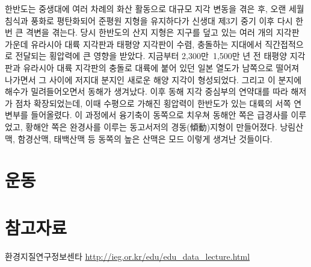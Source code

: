 \documentclass[12pt,a4paper]{book}
\newcommand{\SectionMargin}			{\newpage  \null \vskip 0cm}
\begin{document}
한반도는 중생대에 여러 차례의 화산 활동으로 대규모 지각 변동을 겪은 후, 오랜 세월 침식과 풍화로 평탄화되어 준평원 지형을 유지하다가 신생대 제3기 중기 이후 다시 한 번 큰 격변을 겪는다. 당시 한반도의 산지 지형은 지구를 덮고 있는 여러 개의 지각판 가운데 유라시아 대륙 지각판과 태평양 지각판이 수렴, 충돌하는 지대에서 직간접적으로 전달되는 횡압력에 큰 영향을 받았다. 지금부터 2,300만~1,500만 년 전 태평양 지각판과 유라시아 대륙 지각판의 충돌로 대륙에 붙어 있던 일본 열도가 남쪽으로 떨어져 나가면서 그 사이에 저지대 분지인 새로운 해양 지각이 형성되었다. 그리고 이 분지에 해수가 밀려들어오면서 동해가 생겨났다. 이후 동해 지각 중심부의 연약대를 따라 해저가 점차 확장되었는데, 이때 수평으로 가해진 횡압력이 한반도가 있는 대륙의 서쪽 연변부를 들어올렸다. 이 과정에서 융기축이 동쪽으로 치우쳐 동해안 쪽은 급경사를 이루었고, 황해안 쪽은 완경사를 이루는 동고서저의 경동(傾動)지형이 만들어졌다. 낭림산맥, 함경산맥, 태백산맥 등 동쪽의 높은 산맥은 모드 이렇게 생겨난 것들이다.











































\newpage
\chapter{운동}












\newpage
\chapter{참고자료}


		\SectionMargin
		환경지질연구정보센타
		\url{http://ieg.or.kr/edu/edu_data_lecture.html}
\end{document}
